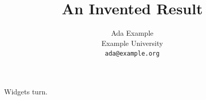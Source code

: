 \documentclass{article}
\title{An Invented Result}
\author{Ada Example \\ Example University \\ \texttt{ada@example.org}}
\begin{document}
\maketitle
Widgets turn.
\end{document}
